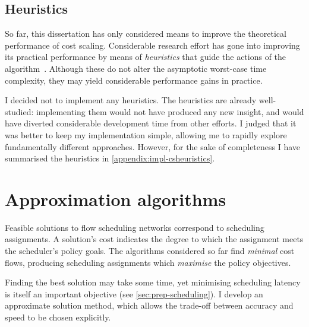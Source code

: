 \subsection{Heuristics}

So far, this dissertation has only considered means to improve the theoretical performance of cost scaling. Considerable research effort has gone into improving its practical performance by means of \emph{heuristics} that guide the actions of the algorithm~\cite{Goldberg:1997}. Although these do not alter the asymptotic worst-case time complexity, they may yield considerable performance gains in practice.

I decided not to implement any heuristics. The heuristics are already well-studied: implementing them would not have produced any new insight, and would have diverted considerable development time from other efforts. I judged that it was better to keep my implementation simple, allowing me to rapidly explore fundamentally different approaches. However, for the sake of completeness I have summarised the heuristics in \cref{appendix:impl-csheuristics}.


\section{Approximation algorithms} \label{sec:impl-approx}


Feasible solutions to flow scheduling networks correspond to scheduling assignments. A solution's cost indicates the degree to which the assignment meets the scheduler's policy goals. The algorithms considered so far find \emph{minimal} cost flows, producing scheduling assignments which \emph{maximise} the policy objectives.

Finding the best solution may take some time, yet minimising scheduling latency is itself an important objective (see \cref{sec:prep-scheduling}). I develop an approximate solution method, which allows the trade-off between accuracy and speed to be chosen explicitly.


